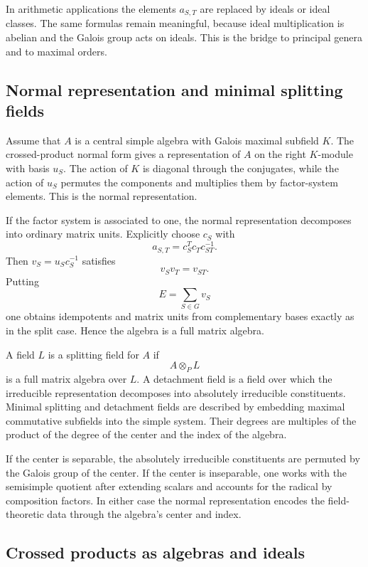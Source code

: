 \documentclass[12pt]{article}
\begin{document}
In arithmetic applications the elements \(a_{S,T}\) are replaced by ideals or ideal classes. The same formulas remain meaningful, because ideal multiplication is abelian and the Galois group acts on ideals. This is the bridge to principal genera and to maximal orders.

\subsection{Normal representation and minimal splitting fields}

Assume that \(A\) is a central simple algebra with Galois maximal subfield \(K\). The crossed-product normal form gives a representation of \(A\) on the right \(K\)-module with basis \(u_S\). The action of \(K\) is diagonal through the conjugates, while the action of \(u_S\) permutes the components and multiplies them by factor-system elements. This is the normal representation.

If the factor system is associated to one, the normal representation decomposes into ordinary matrix units. Explicitly choose \(c_S\) with
\[
  a_{S,T}=c_S^Tc_Tc_{ST}^{-1}.
\]
Then \(v_S=u_Sc_S^{-1}\) satisfies
\[
  v_Sv_T=v_{ST}.
\]
Putting
\[
  E=\sum_{S\in G}v_S
\]
one obtains idempotents and matrix units from complementary bases exactly as in the split case. Hence the algebra is a full matrix algebra.

A field \(L\) is a splitting field for \(A\) if
\[
  A\otimes_PL
\]
is a full matrix algebra over \(L\). A detachment field is a field over which the irreducible representation decomposes into absolutely irreducible constituents. Minimal splitting and detachment fields are described by embedding maximal commutative subfields into the simple system. Their degrees are multiples of the product of the degree of the center and the index of the algebra.

If the center is separable, the absolutely irreducible constituents are permuted by the Galois group of the center. If the center is inseparable, one works with the semisimple quotient after extending scalars and accounts for the radical by composition factors. In either case the normal representation encodes the field-theoretic data through the algebra's center and index.

\subsection{Crossed products as algebras and ideals}
\end{document}
